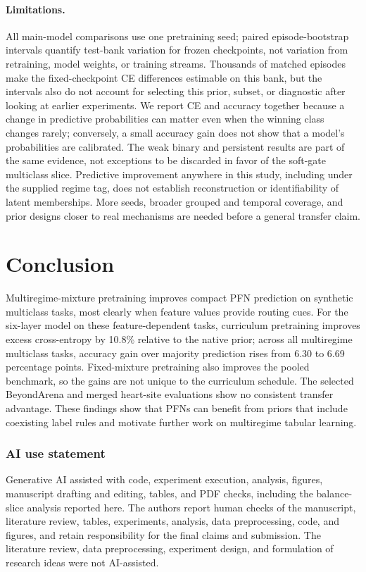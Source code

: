 \documentclass{article}
\begin{document}
\paragraph{Limitations.} All main-model comparisons use one pretraining seed; paired episode-bootstrap intervals quantify test-bank variation for frozen checkpoints, not variation from retraining, model weights, or training streams. Thousands of matched episodes make the fixed-checkpoint CE differences estimable on this bank, but the intervals also do not account for selecting this prior, subset, or diagnostic after looking at earlier experiments. We report CE and accuracy together because a change in predictive probabilities can matter even when the winning class changes rarely; conversely, a small accuracy gain does not show that a model's probabilities are calibrated. The weak binary and persistent results are part of the same evidence, not exceptions to be discarded in favor of the soft-gate multiclass slice. Predictive improvement anywhere in this study, including under the supplied regime tag, does not establish reconstruction or identifiability of latent memberships. More seeds, broader grouped and temporal coverage, and prior designs closer to real mechanisms are needed before a general transfer claim.

\section{Conclusion}
Multiregime-mixture pretraining improves compact PFN prediction on synthetic multiclass tasks, most clearly when feature values provide routing cues. For the six-layer model on these feature-dependent tasks, curriculum pretraining improves excess cross-entropy by 10.8\% relative to the native prior; across all multiregime multiclass tasks, accuracy gain over majority prediction rises from 6.30 to 6.69 percentage points. Fixed-mixture pretraining also improves the pooled benchmark, so the gains are not unique to the curriculum schedule. The selected BeyondArena and merged heart-site evaluations show no consistent transfer advantage. These findings show that PFNs can benefit from priors that include coexisting label rules and motivate further work on multiregime tabular learning.

\subsubsection*{AI use statement}
Generative AI assisted with code, experiment execution, analysis, figures, manuscript drafting and editing, tables, and PDF checks, including the balance-slice analysis reported here. The authors report human checks of the manuscript, literature review, tables, experiments, analysis, data preprocessing, code, and figures, and retain responsibility for the final claims and submission. The literature review, data preprocessing, experiment design, and formulation of research ideas were not AI-assisted.
\end{document}
